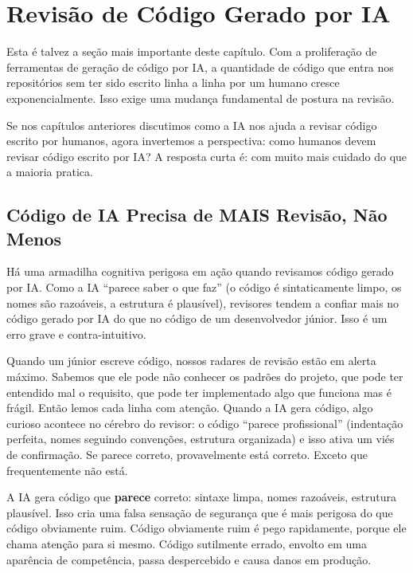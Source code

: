 \section{Revisão de Código Gerado por IA}

Esta é talvez a seção mais importante deste capítulo. Com a proliferação
de ferramentas de geração de código por IA, a quantidade de código que
entra nos repositórios sem ter sido escrito linha a linha por um humano
cresce exponencialmente. Isso exige uma mudança fundamental de postura na revisão.

Se nos capítulos anteriores discutimos como a IA nos ajuda a revisar código escrito
por humanos, agora invertemos a perspectiva: como humanos devem revisar código
escrito por IA? A resposta curta é: com muito mais cuidado do que a maioria pratica.

\subsection{Código de IA Precisa de MAIS Revisão, Não Menos}

Há uma armadilha cognitiva perigosa em ação quando revisamos código gerado por IA.
Como a IA ``parece saber o que faz'' (o código é sintaticamente limpo, os nomes são
razoáveis, a estrutura é plausível), revisores tendem a confiar mais no código
gerado por IA do que no código de um desenvolvedor júnior. Isso é um erro grave e
contra-intuitivo.

Quando um júnior escreve código, nossos radares de revisão estão em alerta máximo.
Sabemos que ele pode não conhecer os padrões do projeto, que pode ter entendido mal
o requisito, que pode ter implementado algo que funciona mas é frágil. Então lemos
cada linha com atenção. Quando a IA gera código, algo curioso acontece no cérebro do
revisor: o código ``parece profissional'' (indentação perfeita, nomes seguindo
convenções, estrutura organizada) e isso ativa um viés de confirmação. Se parece
correto, provavelmente está correto. Exceto que frequentemente não está.

A IA gera código que \textbf{parece} correto: sintaxe limpa, nomes razoáveis,
estrutura plausível. Isso cria uma falsa sensação de segurança que é mais perigosa
do que código obviamente ruim. Código obviamente ruim é pego rapidamente, porque ele chama
atenção para si mesmo. Código sutilmente errado, envolto em uma aparência de
competência, passa despercebido e causa danos em produção.

